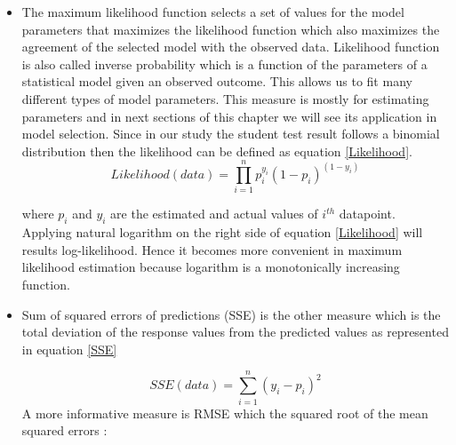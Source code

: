 
\begin{itemize}

\item The maximum likelihood function selects a set of values for the model parameters that maximizes the likelihood function which also maximizes the agreement of the selected model with the observed data. Likelihood function is also called inverse probability which is a function of the parameters of a statistical model given an observed outcome. This allows us to fit many different types of model parameters. This measure is mostly for estimating parameters and in next sections of this chapter we will see its application in model selection. Since in our study the student test result follows a binomial distribution then the likelihood can be defined as equation \ref{Likelihood}.
\begin{equation}
Likelihood(data) = \prod_{i=1}^{n} p_i^{y_i}(1-p_i)^{(1-y_i)}
\label{Likelihood}
\end{equation}

where $p_i$ and $y_i$ are the estimated and actual values of $i^{th}$ datapoint. Applying natural logarithm on the right side of equation \ref{Likelihood} will results log-likelihood. Hence it becomes more convenient in maximum likelihood estimation because logarithm is a monotonically increasing function.

\item Sum of squared errors of predictions (SSE) is the other measure which is the total deviation of the response values from the predicted values as represented in equation \ref{SSE}

\begin{equation}
SSE(data) = \sum_{i=1}^{n} (y_i - p_i)^2
\label{SSE}
\end{equation}
A more informative measure is RMSE which the squared root of the mean squared errors  :


\end{itemize}
